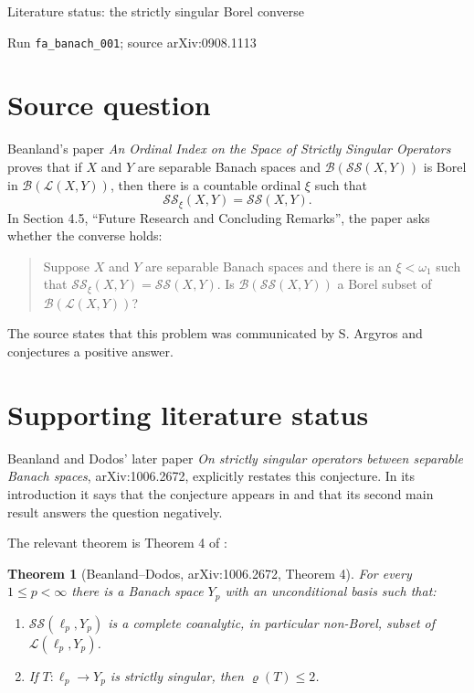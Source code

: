 \documentclass[11pt]{article}
\newtheorem{theorem}{Theorem}
\newcommand{\SSing}{\mathcal{SS}}
\newcommand{\LLop}{\mathcal{L}}
\newcommand{\Bell}{\mathcal{B}}
\begin{document}
\begin{center}
{\Large Literature status: the strictly singular Borel converse}

\medskip
{\small Run \texttt{fa\_banach\_001}; source arXiv:0908.1113}
\end{center}

\section*{Source question}

Beanland's paper \emph{An Ordinal Index on the Space of Strictly Singular
Operators} proves that if \(X\) and \(Y\) are separable Banach spaces and
\(\Bell(\SSing(X,Y))\) is Borel in \(\Bell(\LLop(X,Y))\), then there is a
countable ordinal \(\xi\) such that
\[
  \SSing_\xi(X,Y)=\SSing(X,Y).
\]
In Section 4.5, ``Future Research and Concluding Remarks'', the paper asks
whether the converse holds:

\begin{quote}
Suppose \(X\) and \(Y\) are separable Banach spaces and there is an
\(\xi<\omega_1\) such that
\(\SSing_\xi(X,Y)=\SSing(X,Y)\).  Is
\(\Bell(\SSing(X,Y))\) a Borel subset of \(\Bell(\LLop(X,Y))\)?
\end{quote}

The source states that this problem was communicated by S. Argyros and
conjectures a positive answer.

\section*{Supporting literature status}

Beanland and Dodos' later paper \emph{On strictly singular operators between
separable Banach spaces}, arXiv:1006.2672, explicitly restates this conjecture.
In its introduction it says that the conjecture appears in \cite[\S 4.5]{Beanland}
and that its second main result answers the question negatively.

The relevant theorem is Theorem 4 of \cite{BeanlandDodos}:

\begin{theorem}[Beanland--Dodos, arXiv:1006.2672, Theorem 4]
For every \(1\le p<\infty\) there is a Banach space \(Y_p\) with an
unconditional basis such that:
\begin{enumerate}
\item \(\SSing(\ell_p,Y_p)\) is a complete coanalytic, in particular non-Borel,
subset of \(\LLop(\ell_p,Y_p)\).
\item If \(T:\ell_p\to Y_p\) is strictly singular, then \(\varrho(T)\le 2\).
\end{enumerate}
\end{theorem}
\end{document}
